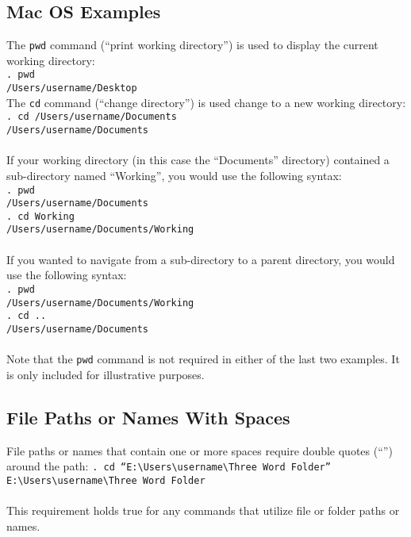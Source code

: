 \documentclass[letterpaper,11pt]{article}
\begin{document}
\subsection{Mac OS Examples}
The \texttt{{\color{Red}pwd}} command (``print working directory'') is used to display the current working directory: \\
\texttt{. {\color{Red}pwd}}  \\
\texttt{/Users/username/Desktop} \\
The \texttt{{\color{Red}cd}} command (``change directory'') is used change to a new working directory: \\
\texttt{. {\color{Red}cd} /Users/username/Documents}  \\
\texttt{/Users/username/Documents} \\
\\
If your working directory (in this case the ``Documents'' directory) contained a sub-directory named ``Working'', you would use the following syntax:\\
\texttt{. {\color{Red}pwd}}  \\
\texttt{/Users/username/Documents} \\
\texttt{. {\color{Red}cd} Working}  \\
\texttt{/Users/username/Documents/Working} \\
\\
If you wanted to navigate from a sub-directory to a parent directory, you would use the following syntax:\\
\texttt{. {\color{Red}pwd}}  \\
\texttt{/Users/username/Documents/Working} \\
\texttt{. {\color{Red}cd} ..}  \\
\texttt{/Users/username/Documents} \\
\\
Note that the \texttt{{\color{Red}pwd}} command is not required in either of the last two examples. It is only included for illustrative purposes.\\
\subsection{File Paths or Names With Spaces}
File paths or names that contain one or more spaces require double quotes (``'') around the path:
\texttt{. {\color{Red}cd} ``E:\textbackslash{}Users\textbackslash{}username\textbackslash{}Three Word Folder''}  \\
\texttt{E:\textbackslash{}Users\textbackslash{}username\textbackslash{}Three Word Folder} \\
\\
This requirement holds true for any commands that utilize file or folder paths or names.\\
\end{document}
